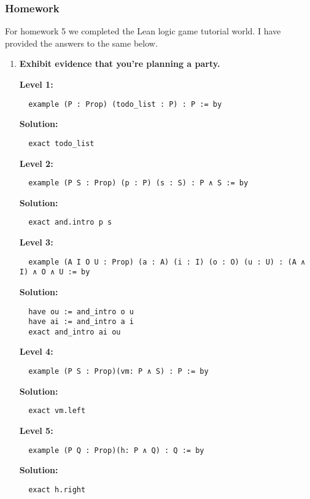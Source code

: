 \documentclass{article}
\theoremstyle{theorem}
\theoremstyle{definition}
\theoremstyle{remark}
\begin{document}
\subsubsection*{Homework}
For homework 5 we completed the Lean logic game tutorial world. I have provided the answers to the same below. 

\begin{enumerate}
  \item \textbf{Exhibit evidence that you're planning a party.}

  \textbf{Level 1:}
  \begin{verbatim}
  example (P : Prop) (todo_list : P) : P := by
  \end{verbatim}

  \textbf{Solution:}
  \begin{verbatim}
  exact todo_list
  \end{verbatim}

  \textbf{Level 2:}
  \begin{verbatim}
  example (P S : Prop) (p : P) (s : S) : P ∧ S := by
  \end{verbatim}

  \textbf{Solution:}
  \begin{verbatim}
  exact and.intro p s
  \end{verbatim}

  \textbf{Level 3:}
  \begin{verbatim}
  example (A I O U : Prop) (a : A) (i : I) (o : O) (u : U) : (A ∧ I) ∧ O ∧ U := by
  \end{verbatim}

  \textbf{Solution:}
  \begin{verbatim}
  have ou := and_intro o u
  have ai := and_intro a i
  exact and_intro ai ou
  \end{verbatim}

  \textbf{Level 4:}
  \begin{verbatim}
  example (P S : Prop)(vm: P ∧ S) : P := by
  \end{verbatim}

  \textbf{Solution:}
  \begin{verbatim}
  exact vm.left
  \end{verbatim}

  \textbf{Level 5:}
  \begin{verbatim}
  example (P Q : Prop)(h: P ∧ Q) : Q := by
  \end{verbatim}

  \textbf{Solution:}
  \begin{verbatim}
  exact h.right
  \end{verbatim}


\end{enumerate}
\end{document}
